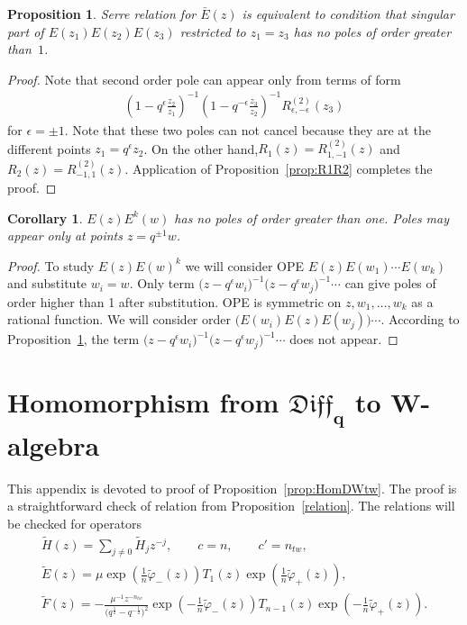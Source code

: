 \documentclass[pdftex]{sigma}
\numberwithin{equation}{section}
\newtheorem{Proposition}[Theorem]{Proposition}
\newtheorem{Corollary}[Theorem]{Corollary}
\theoremstyle{definition}
\newcommand{\half}{\frac{1}{2}}
\newcommand{\qD}{\mathfrak{Diff}_q}
\newcommand{\bE}{\bar{E}}
\newcommand{\tE}{\tilde{E}}
\newcommand{\tF}{\tilde{F}}
\newcommand{\tH}{\tilde{H}}
\newcommand{\tphi}{\tilde{\varphi}}
\newcommand{\ha}{\tilde{H}}
\begin{document}
\begin{Proposition} \label{prop:SerreOPE}Serre relation for $\bE(z)$ is equivalent to condition that singular part of $E(z_1) E(z_2) E(z_3) $ restricted to $z_1=z_3$ has no poles of order greater than~$1$.
\end{Proposition}

\begin{proof}Note that second order pole can appear only from terms of form
\begin{gather*}
\left(1-q^{ \epsilon} \frac{z_2}{z_1} \right)^{-1} \left(1-q^{-\epsilon}\frac{z_3}{z_2} \right)^{-1} R^{(2)}_{\epsilon , -\epsilon} (z_3)
\end{gather*}
for $\epsilon = \pm 1$. Note that these two poles can not cancel because they are at the different points $z_1 = q^{\epsilon} z_2$. On the other hand,$R_1(z) = R^{(2)}_{1 , -1} (z)$ and $R_2(z) = R^{(2)}_{-1 , 1} (z)$. Application of Proposition~\ref{prop:R1R2} completes the proof.
\end{proof}

\begin{Corollary} \label{Corollary:EE^k}$E(z) E^k(w)$ has no poles of order greater than one. Poles may appear only at points $z=q^{\pm 1} w$.
\end{Corollary}

\begin{proof}
To study $E(z) E(w)^k$ we will consider OPE $E(z) E(w_1)\cdots E(w_{k})$ and substitute $w_i=w$. Only term $\big(z-q^{\epsilon} w_i\big)^{-1} \big(z-q^{\epsilon}w_j\big)^{-1} \cdots$ can give poles of order higher than 1 after substitution. OPE is symmetric on $z, w_1, \dots, w_{k}$ as a rational function. We will consider order $\big( E(w_i) E(z) E(w_j) \big) \cdots$. According to Proposition~\ref{prop:SerreOPE}, the term $\big(z-q^{\epsilon} w_i\big)^{-1} \big(z-q^{\epsilon}w_j\big)^{-1} \cdots$ does not appear.
\end{proof}


\section[Homomorphism from $\qD$ to $W$-algebra]{Homomorphism from $\boldsymbol{\qD}$ to $\boldsymbol{W}$-algebra} \label{Appendix:HomWD}

This appendix is devoted to proof of Proposition~\ref{prop:HomDWtw}. The proof is a straightforward check of relation from Proposition~\ref{relation}. The relations will be checked for operators
\begin{gather*}
\tH (z)= \sum_{j \neq 0} \ha_j z^{-j}, \qquad c=n, \qquad c'=n_{tw}, \\
\tE(z) = \mu \exp \left( \frac{1}{n}{\tphi_-(z)} \right) T_1(z) \exp \left( \frac{1}{n} \tphi_+ (z) \right), \\
\tF(z) = - \frac{\mu^{-1} z^{-n_{tw}}}{\big(q^{\half}-q^{-\half}\big)^2} \exp \left(- \frac{1}{n}{\tphi_-(z)} \right) T_{n-1}(z) \exp \left( -\frac{1}{n} \tphi_+ (z) \right).
\end{gather*}
\end{document}
